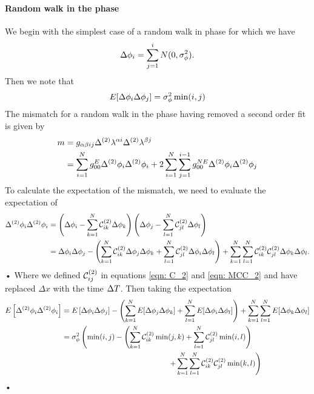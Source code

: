 \paragraph{Random walk in the phase}
We begin with the simplest case of a random walk in phase for which we have
\begin{equation}
\Delta\phi_{i} = \sum_{j=1}^{i}N(0, \sigma_{\phi}^{2}).
\end{equation}
Then we note that
\begin{equation}
E[\Delta\phi_{i} \Delta\phi_{j}] = \sigma_{\phi}^{2} \min(i, j)
\end{equation}
The mismatch for a random walk in the phase having removed a second order
fit is given by
\begin{align}
m & = g_{\alpha \beta i j} \Delta^{(2)}\lambda^{\alpha i}\Delta^{(2)}\lambda^{\beta j} \\ 
& = \sum_{i=1}^{N}g_{00}^{E} \Delta^{(2)}\phi_{i}\Delta^{(2)}\phi_{i} 
+ 2 \sum_{i=1}^{N}\sum_{j=1}^{i-1}g_{00}^{NE}\Delta^{(2)}\phi_{i}\Delta^{(2)}\phi_{j}
\label{eqn: 4202540871}
\end{align}
To calculate the expectation of the mismatch, we need to evaluate the
expectation of
\begin{align}
\Delta^{(2)}\phi_{i}\Delta^{(2)}\phi_{i}& = \left(\Delta\phi_{i} 
- \sum_{k=1}^{N}\mathcal{C}^{(2)}_{ik}\Delta\phi_{k}\right)
 \left(\Delta\phi_{j} - \sum_{l=1}^{N}\mathcal{C}^{(2)}_{jl}\Delta\phi_{l}\right) \\
& = \Delta\phi_{i}\Delta\phi_{j} - 
\left(\sum_{k=1}^{N}\mathcal{C}^{(2)}_{ik} \Delta\phi_{j}\Delta\phi_{k} 
+ \sum_{l=1}^{N}\mathcal{C}^{(2)}_{jl}\Delta\phi_{i}\Delta\phi_{l}\right) + 
\sum_{k=1}^{N}\sum_{l=1}^{N}\mathcal{C}^{(2)}_{ik}\mathcal{C}^{(2)}_{jl} \Delta\phi_{k}\Delta\phi_{l}.
\end{align}•
Where we defined $\mathcal{C}^{(2)}_{ij}$ in equations \ref{eqn: C_2} and \ref{eqn:  MCC_2}
and have replaced $\Delta x$ with the time $\Delta T$. Then taking the expectation
\begin{align}
\E{\Delta^{(2)}\phi_{i}\Delta^{(2)}\phi_{i}} & = 
E\left[\Delta\phi_{i}\Delta\phi_{j}\right] - 
\left(\s{k=1}{N}E[\Delta\phi_{j}\Delta\phi_{k}] 
+ \s{l=1}{N}E[\Delta\phi_{i}\Delta\phi_{l}]\right) + 
\s{k=1}{N}\s{l=1}{N}E[\Delta\phi_{k}\Delta\phi_{l}] 
    \label{eqn: expected mismatch k2}\\
& = \sigma^{2}_{\phi} \left(\min(i, j) - \left(\s{k=1}{N}\CT_{ik} \min(j, k) 
+ \s{l=1}{N}\CT_{jl}\min(i, l) \right)\right. \notag \\
& \hspace{50mm} \left. + \s{k=1}{N}\s{l=1}{N}\CT_{ik}\CT_{jl}\min(k, l)\right)
\label{eqn: expected mismatch dP0idP0j_k2}
\end{align}• 
